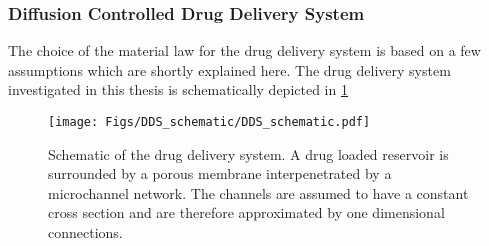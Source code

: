 \subsubsection{Diffusion Controlled Drug Delivery System}
The choice of the material law for the drug delivery system is based on a few assumptions which are shortly explained here. The drug delivery system investigated in this thesis is schematically depicted in \cref{fig:DDS}
\begin{figure}[h!]
  \centering
  \texttt{[image: Figs/DDS\_schematic/DDS\_schematic.pdf]}
  \caption{Schematic of the drug delivery system. A drug loaded reservoir is surrounded by a porous membrane interpenetrated by a microchannel network. The channels are assumed to have a constant cross section and are therefore approximated by one dimensional connections.}
  \label{fig:DDS}
\end{figure}

